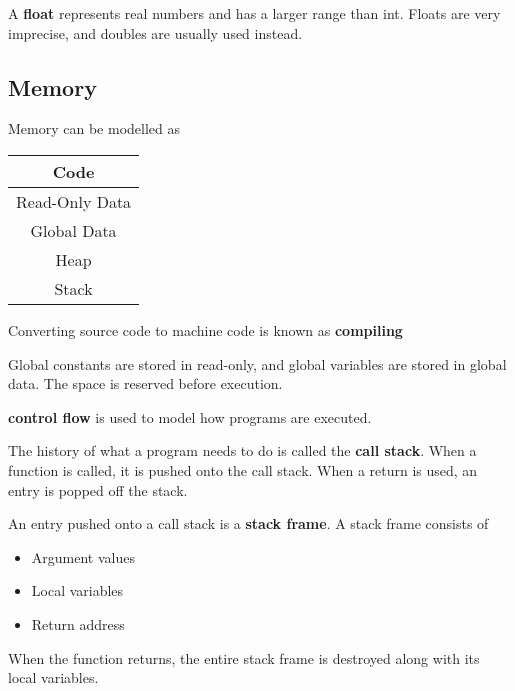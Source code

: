 \documentclass[english, 12pt]{article}
\begin{document}
\begin{defn}
A \textbf{float} represents real numbers and has a larger range than int. Floats are very imprecise, and doubles are usually used instead.
\end{defn}


\subsection{Memory}
Memory can be modelled as
\begin{center}
\begin{tabular}{|c|}
\hline
Code \\
\hline
Read-Only Data \\
\hline
Global Data \\
\hline
Heap \\
\hline
Stack \\
\hline
\end{tabular}
\end{center}
\begin{defn}
Converting source code to machine code is known as \textbf{compiling}
\end{defn}

\begin{note}
Global constants are stored in read-only, and global variables are stored in global data. The space is reserved before execution.
\end{note}

\begin{defn}
\textbf{control flow} is used to model how programs are executed.
\end{defn}

\begin{defn}
The history of what a program needs to do is called the \textbf{call stack}. When a function is called, it is pushed onto the call stack. When a return is used, an entry is popped off the stack.
\end{defn}

\begin{defn}
An entry pushed onto a call stack is a \textbf{stack frame}. A stack frame consists of
\begin{itemize}
\item Argument values
\item Local variables
\item Return address
\end{itemize}
\end{defn}
\begin{qte}
When the function returns, the entire stack frame is destroyed along with its local variables.
\end{qte}
\end{document}
